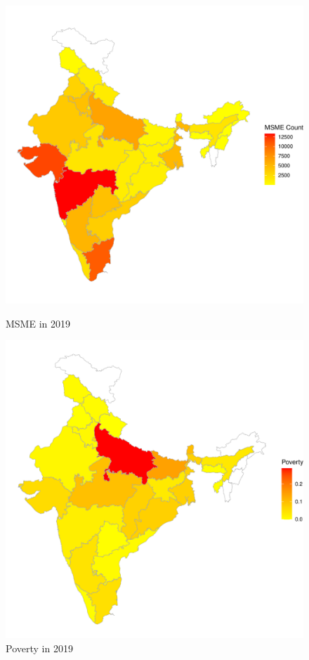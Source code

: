 \documentclass [12pt]{article}
\begin{document}
\begin{figure}[htbp]
    \centering
    \begin{minipage}[b]{.45\textwidth}
        \centering
        \includegraphics[width=\linewidth]{msme_plot.pdf}
        \caption{MSME in 2019}
        \label{fig:msme_plot}
    \end{minipage}
    \hfill
    \begin{minipage}[b]{0.45\textwidth}
        \centering
        \includegraphics[width=0.95\linewidth]{poverty_plot.pdf}
        \caption{Poverty in 2019}
        \label{fig:poverty_plot}
    \end{minipage}
\end{figure}
\end{document}
